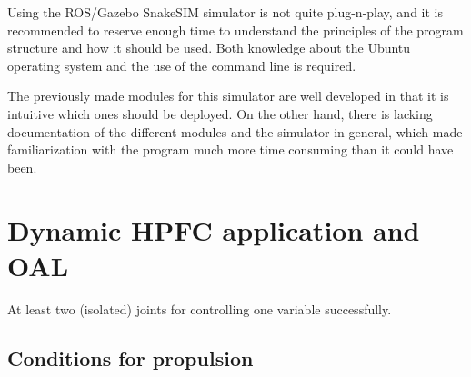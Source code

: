 Using the ROS/Gazebo SnakeSIM simulator is not quite plug-n-play, and it is recommended to reserve enough time to understand the principles of the program structure and how it should be used. Both knowledge about the Ubuntu operating system and the use of the command line is required.

The previously made modules for this simulator are well developed in that it is intuitive which ones should be deployed. On the other hand, there is lacking documentation of the different modules and the simulator in general, which made familiarization with the program much more time consuming than it could have been.

\section{Dynamic HPFC application and OAL}

At least two (isolated) joints for controlling one variable successfully.

\subsection{Conditions for propulsion}